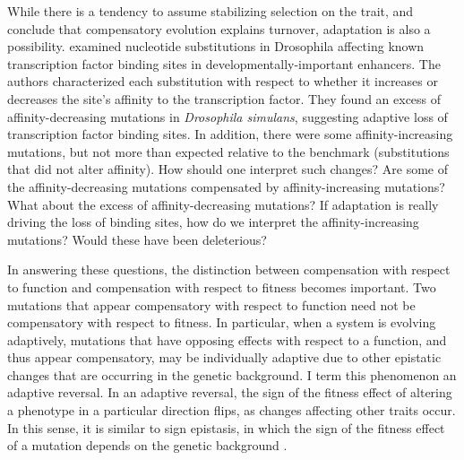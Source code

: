 \documentclass[dvips,12pt,twoside,titlepage]{article}
\begin{document}
While there is a tendency to assume stabilizing selection on the trait, and conclude that compensatory evolution explains turnover, adaptation is also a possibility. 
 examined nucleotide substitutions in Drosophila affecting known transcription factor binding sites in developmentally-important enhancers. 
The authors characterized each substitution with respect to whether it increases or decreases the site's affinity to the transcription factor.
They found an excess of affinity-decreasing mutations in \emph{Drosophila simulans}, suggesting adaptive loss of transcription factor binding sites. 
In addition, there were some affinity-increasing mutations, but not more than expected relative to the benchmark (substitutions that did not alter affinity).
How should one interpret such changes? 
Are some of the affinity-decreasing mutations compensated by affinity-increasing mutations? 
What about the excess of affinity-decreasing mutations? 
If adaptation is really driving the loss of binding sites, how do we interpret the affinity-increasing mutations? 
Would these have been deleterious?

In answering these questions, the distinction between compensation with respect to function and compensation with respect to fitness becomes important.
Two mutations that appear compensatory with respect to function need not be compensatory with respect to fitness. 
In particular, when a system is evolving adaptively, mutations that have opposing effects with respect to a function, and thus appear compensatory, may be individually adaptive due to other epistatic changes that are occurring in the genetic background.
I term this phenomenon an adaptive reversal. 
In an adaptive reversal, the sign of the fitness effect of altering a phenotype in a particular direction flips, as changes affecting other traits occur. In this sense, it is similar to sign epistasis, in which the sign of the fitness effect of a mutation depends on the genetic background \cite{Weinreich:2005vg}.
\end{document}

